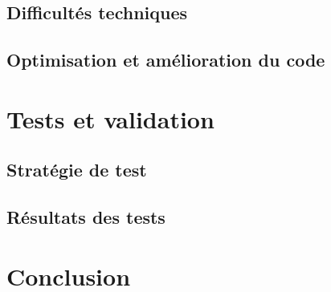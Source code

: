\subsection{Difficultés techniques}

\subsection{Optimisation et amélioration du code}

\section{Tests et validation}
\subsection{Stratégie de test}

\subsection{Résultats des tests}

\section{Conclusion}
\clearpage